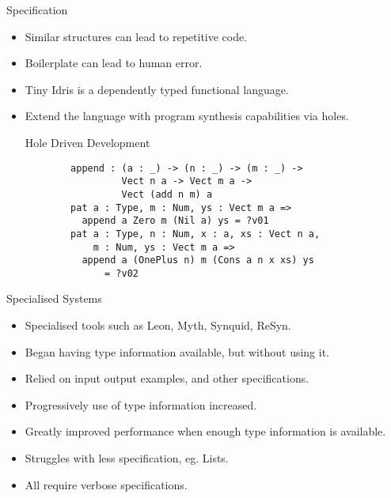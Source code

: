 \documentclass[presentation]{beamer}
\begin{document}
\begin{frame}[fragile]{Specification}
  \begin{itemize}
  \item Similar structures can lead to repetitive code.
  \item Boilerplate can lead to human error.
  \item Tiny Idris is a dependently typed functional language.
  \item Extend the language with program synthesis capabilities via holes. 
    \begin{block}{Hole Driven Development}
      \begin{verbatim}
        append : (a : _) -> (n : _) -> (m : _) ->
                 Vect n a -> Vect m a ->
                 Vect (add n m) a
        pat a : Type, m : Num, ys : Vect m a =>
          append a Zero m (Nil a) ys = ?v01
        pat a : Type, n : Num, x : a, xs : Vect n a,
            m : Num, ys : Vect m a =>
          append a (OnePlus n) m (Cons a n x xs) ys
              = ?v02
      \end{verbatim}
    \end{block}
  \end{itemize}
\end{frame}

\begin{frame}[fragile]{Specialised Systems}
  \begin{itemize}
  \item Specialised tools such as Leon, Myth, Synquid, ReSyn.
  \item Began having type information available, but without using it.
  \item Relied on input output examples, and other specifications. 
  \item Progressively use of type information increased.
  \item Greatly improved performance when enough type information is
    available.
  \item Struggles with less specification, eg. Lists.
  \item All require verbose specifications.
  \end{itemize}
\end{frame}
\end{document}
